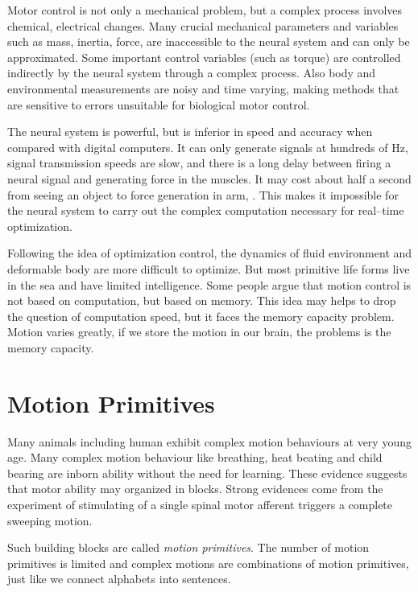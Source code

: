 \begin{itemize}
Motor control is not only a mechanical problem, but a complex process involves chemical, electrical changes.
Many crucial mechanical parameters and variables such as mass, inertia, force, are inaccessible to the neural system and can only be approximated. 
Some important control variables (such as torque) are controlled indirectly by the neural system through a complex process.
Also body and environmental measurements are noisy and time varying, making methods that are sensitive to errors unsuitable for biological motor control.

The neural system is powerful, but is inferior in speed and accuracy when compared with digital computers. 
It can only generate signals at hundreds of Hz, signal transmission speeds are slow, and there is a long delay between firing a neural signal and generating force in the muscles.
It may cost about half a second from seeing an object to force generation in arm, . 
This makes it impossible for the neural system to carry out the complex computation necessary for real–time optimization.


Following the idea of optimization control, the dynamics of fluid environment and deformable body are more difficult to optimize. 
But most primitive life forms live in the sea and have limited intelligence. 
Some people argue that motion control is not based on computation, but based on memory.
This idea may helps to drop the question of computation speed, but it faces the memory capacity problem. 
Motion varies greatly, if we store the motion in our brain, the problems is the memory capacity.
\end{itemize}

\section{Motion Primitives}
Many animals including human exhibit complex motion behaviours at very young age.
Many complex motion behaviour like breathing, heat beating and child bearing are inborn ability without the need for learning.
These evidence suggests that motor ability may organized in blocks\citep{bizzi1995modular,bizzi2002book}.
Strong evidences come from the experiment of stimulating of a single spinal motor afferent triggers a complete sweeping motion\citep{bizzi1995modular}.

Such building blocks are called \emph{motion primitives}.
The number of motion primitives is limited and
complex motions are combinations of motion primitives, just like we connect alphabets into sentences.


